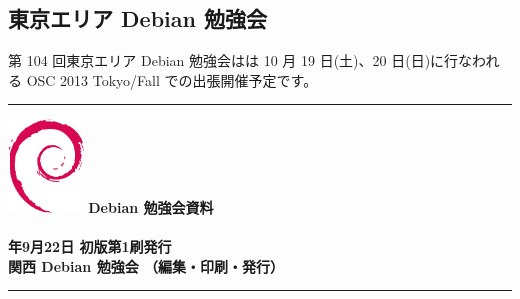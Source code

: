 \documentclass[mingoth,a4paper]{jsarticle}
\newcommand{\debmtgyear}{2013}
\newcommand{\debmtgdate}{22}
\newcommand{\debmtgmonth}{9}
\begin{document}
\subsection{東京エリア Debian 勉強会}

第 104 回東京エリア Debian 勉強会はは 10 月 19 日(土)、20 日(日)に行なわれる OSC 2013 Tokyo/Fall での出張開催予定です。

%
\mbox{}\newpage

\printindex

 \begin{minipage}[b]{0.2\hsize}
 \end{minipage}
 \begin{minipage}[b]{0.8\hsize}

 \vspace*{15cm}
 \rule{\hsize}{1mm}
 \vspace{2mm}
 \includegraphics[width=2cm]{image200502/openlogo-nd.eps}
 \noindent \Large \bf Debian 勉強会資料\\ \\
 \noindent \normalfont \debmtgyear{}年\debmtgmonth{}月\debmtgdate{}日 \hspace{5mm}  初版第1刷発行\\
 \noindent \normalfont 関西 Debian 勉強会 （編集・印刷・発行）\\
 \rule{\hsize}{1mm}
 \end{minipage}
\end{document}
